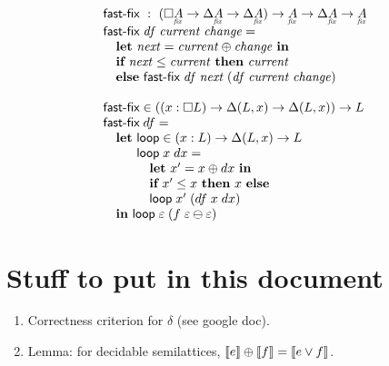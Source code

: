 \documentclass{article}
\begin{document}
\[\begin{array}{l}
  \textsf{fast-fix} ~:~
  (\Disc{\fixtype{A}} \to \Delta\fixtype{A} \to \Delta\fixtype{A})
  \to \fixtype{A} \to \Delta\fixtype{A} \to \fixtype{A}\\
  \textsf{fast-fix}\; \mi{df}\; \mi{current}\; \mi{change} =\\
  \quad \textbf{let}~ {\mi{next} = \mi{current} \oplus \mi{change}}
  ~\textbf{in}\\
  \quad \textbf{if}~ \mi{next} \le \mi{current}
  ~\textbf{then}~ \mi{current}\\
  \quad \textbf{else}~ \textsf{fast-fix}\; \mi{df}\; \mi{next}
  \;(\mi{df}\; \mi{current}\; \mi{change})\\
  \\
  \textsf{fast-fix}
  \in ((x : \Disc{L}) \to \Delta(L, x) \to \Delta(L, x)) \to L
  \\
  \textsf{fast-fix} \; df =\\
  \quad\textbf{let}~ \textsf{loop} \in (x : L) \to \Delta(L, x) \to L\\
  \quad\phantom{\textbf{let}~} \textsf{loop} \;x \;dx =\\
  \quad\phantom{\textbf{let}~}\quad
  \textbf{let}~ x' = x \oplus dx ~\textbf{in}\\
  \quad\phantom{\textbf{let}~}\quad
  \textbf{if}~ x' \le x ~\textbf{then}~ x ~\textbf{else}\\
  \quad\phantom{\textbf{let}~}\quad
  \textsf{loop} \;x' \;(df \; x \; dx)\\
  \quad\textbf{in}~ \textsf{loop} \; \unit \; (f \; \unit \ominus \unit)
\end{array}\]


\section{Stuff to put in this document}

\begin{enumerate}
\item Correctness criterion for $\delta$ (see google doc).
\item Lemma: for decidable semilattices, $\llbracket{e}\rrbracket \oplus \llbracket{f}\rrbracket = \llbracket{e \vee
  f}\rrbracket$.
\end{enumerate}
\end{document}
